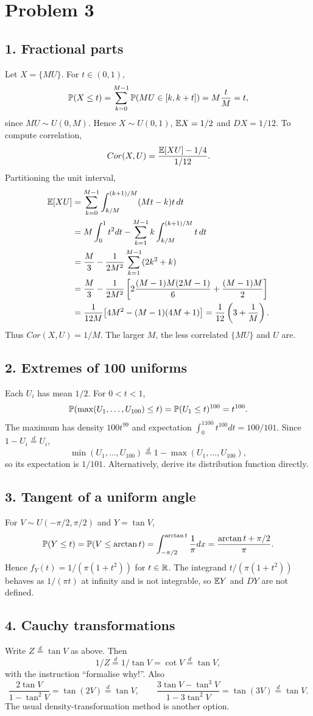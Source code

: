 \documentclass[a4paper]{article}
\begin{document}
\section*{Problem 3}
\subsection*{1. Fractional parts}
Let $X=\{MU\}$. For $t\in(0,1)$,
\[\P(X\le t)=\sum_{k=0}^{M-1}\P(MU\in[k,k+t])=M\frac tM=t,\]
since $MU\sim U(0,M)$. Hence $X\sim U(0,1)$, $\E X=1/2$ and $DX=1/12$.
To compute correlation,
\[Cor(X,U)=\frac{\E[XU]-1/4}{1/12}.\]
Partitioning the unit interval,
\begin{align*}
\E[XU]&=\sum_{k=0}^{M-1}\int_{k/M}^{(k+1)/M}(Mt-k)t\,dt\\
&=M\int_0^1t^2dt-\sum_{k=1}^{M-1}k\int_{k/M}^{(k+1)/M}t\,dt\\
&=\frac M3-\frac1{2M^2}\sum_{k=1}^{M-1}(2k^2+k)\\
&=\frac M3-\frac1{2M^2}\left[2\frac{(M-1)M(2M-1)}6+\frac{(M-1)M}2\right]\\
&=\frac1{12M}\bigl[4M^2-(M-1)(4M+1)\bigr]
=\frac1{12}\left(3+\frac1M\right).
\end{align*}
Thus $Cor(X,U)=1/M$. The larger $M$, the less correlated $\{MU\}$ and $U$ are.
\subsection*{2. Extremes of 100 uniforms}
Each $U_i$ has mean $1/2$. For $0<t<1$,
\[\P(\max(U_1,\dots,U_{100})\le t)=\P(U_1\le t)^{100}=t^{100}.\]
The maximum has density $100t^{99}$ and expectation $\int_0^1100t^{100}dt=100/101$. Since $1-U_i\overset d=U_i$,
\[\min(U_1,\dots,U_{100})\overset d=1-\max(U_1,\dots,U_{100}),\]
so its expectation is $1/101$. Alternatively, derive its distribution function directly.
\subsection*{3. Tangent of a uniform angle}
For $V\sim U(-\pi/2,\pi/2)$ and $Y=\tan V$,
\[\P(Y\le t)=\P(V\le\arctan t)=\int_{-\pi/2}^{\arctan t}\frac1\pi dx=\frac{\arctan t+\pi/2}{\pi}.\]
Hence $f_Y(t)=1/(\pi(1+t^2))$ for $t\in\R$. The integrand $t/(\pi(1+t^2))$ behaves as $1/(\pi t)$ at infinity and is not integrable, so $\E Y$ and $DY$ are not defined.
\subsection*{4. Cauchy transformations}
Write $Z\overset d=\tan V$ as above. Then
\[1/Z\overset d=1/\tan V=\cot V\overset d=\tan V,\]
with the instruction ``formalise why!''. Also
\[\frac{2\tan V}{1-\tan^2V}=\tan(2V)\overset d=\tan V,\qquad
\frac{3\tan V-\tan^3V}{1-3\tan^2V}=\tan(3V)\overset d=\tan V.\]
The usual density-transformation method is another option.
\end{document}

